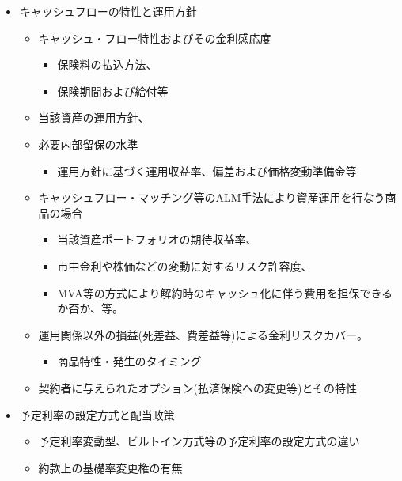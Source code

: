 \documentclass[
]{article}
\providecommand{\tightlist}{%
  \setlength{\itemsep}{0pt}\setlength{\parskip}{0pt}}
\begin{document}
\begin{itemize}
  \begin{itemize}
  \tightlist
  \item
    キャッシュフローの特性と運用方針

    \begin{itemize}
    \tightlist
    \item
      キャッシュ・フロー特性およびその金利感応度

      \begin{itemize}
      \tightlist
      \item
        保険料の払込方法、
      \item
        保険期間および給付等
      \end{itemize}
    \item
      当該資産の運用方針、
    \item
      必要内部留保の水準

      \begin{itemize}
      \tightlist
      \item
        運用方針に基づく運用収益率、偏差および価格変動準備金等
      \end{itemize}
    \item
      キャッシュフロー・マッチング等のALM手法により資産運用を行なう商品の場合

      \begin{itemize}
      \tightlist
      \item
        当該資産ポートフォリオの期待収益率、
      \item
        市中金利や株価などの変動に対するリスク許容度、
      \item
        MVA等の方式により解約時のキャッシュ化に伴う費用を担保できるか否か、等。
      \end{itemize}
    \item
      運用関係以外の損益(死差益、費差益等)による金利リスクカバー。

      \begin{itemize}
      \tightlist
      \item
        商品特性・発生のタイミング
      \end{itemize}
    \item
      契約者に与えられたオプション(払済保険への変更等)とその特性
    \end{itemize}
  \item
    予定利率の設定方式と配当政策

    \begin{itemize}
    \tightlist
    \item
      予定利率変動型、ビルトイン方式等の予定利率の設定方式の違い
    \item
      約款上の基礎率変更権の有無


\end{itemize}
\end{itemize}
\end{itemize}
\end{document}
